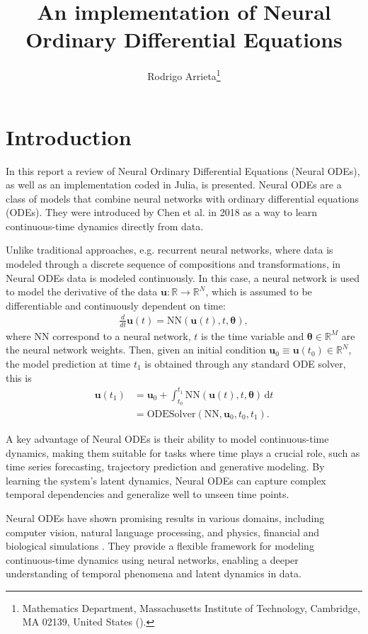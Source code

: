 \documentclass[final,onefignum,onetabnum]{siamart220329}
\title{An implementation of Neural Ordinary Differential Equations}
\author{Rodrigo Arrieta\thanks{Mathematics Department, Massachusetts Institute of Technology, Cambridge, MA 02139, United States (\email{rarrieta@mit.edu}).}}
\newcommand{\bol}{\boldsymbol}
\newcommand{\de}{\,\mathrm{d}}
\newcommand{\R}{\mathbb{R}}
\begin{document}
\maketitle

\section{Introduction}
In this report a review of Neural Ordinary Differential Equations (Neural ODEs), as well as an implementation coded in Julia, is presented. Neural ODEs are a class of models that combine neural networks with ordinary differential equations (ODEs). They were introduced by Chen et al. in 2018 \cite{chen2018neural} as a way to learn continuous-time dynamics directly from data.

Unlike traditional approaches, e.g. recurrent neural networks, where data is modeled through a discrete sequence of compositions and transformations, in Neural ODEs data is modeled continuously. In this case, a neural network is used to model the derivative of the data $\bol u:\R\rightarrow\R^N$, which is assumed to be differentiable and continuously dependent on time:
\begin{align}
	\frac{d}{dt}\bol{u}(t) = \text{NN}(\bol{u}(t),t,\bol \theta),
\end{align}
where $\text{NN}$ correspond to a neural network, $t$ is the time variable and $\bol \theta\in \R^M$ are the neural network weights. Then, given an initial condition $\bol u_0 \equiv \bol u(t_0)\in\R^N$, the model prediction at time $t_1$ is obtained through any standard ODE solver, this is
\begin{align}
	\bol{u}(t_1) &= \bol{u}_0 + \int_{t_0}^{t_1} \text{NN}(\bol{u}(t),t,\bol \theta) \de{t}\\
	&= \text{ODESolver}(\text{NN},\bol{u}_0,t_0,t_1). \label{eq:odesolver}
\end{align}

A key advantage of Neural ODEs is their ability to model continuous-time dynamics, making them suitable for tasks where time plays a crucial role, such as time series forecasting, trajectory prediction and generative modeling. By learning the system's latent dynamics, Neural ODEs can capture complex temporal dependencies and generalize well to unseen time points.

Neural ODEs have shown promising results in various domains, including computer vision, natural language processing, and physics, financial and biological simulations \cite{kidger2022neural}. They provide a flexible framework for modeling continuous-time dynamics using neural networks, enabling a deeper understanding of temporal phenomena and latent dynamics in data.
\end{document}
